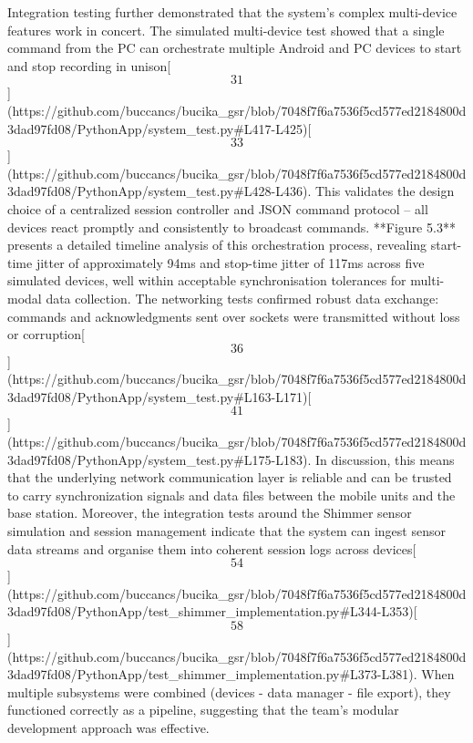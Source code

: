\documentclass[12pt,a4paper]{article}
\begin{document}
{Integration testing further demonstrated that the system's complex
multi-device features work in concert. The simulated multi-device test
showed that a single command from the PC can orchestrate multiple
Android and PC devices to start and stop recording in
unison[\[31\]](https://github.com/buccancs/bucika_gsr/blob/7048f7f6a7536f5cd577ed2184800d3dad97fd08/PythonApp/system_test.py#L417-L425)[\[33\]](https://github.com/buccancs/bucika_gsr/blob/7048f7f6a7536f5cd577ed2184800d3dad97fd08/PythonApp/system_test.py#L428-L436).
This validates the design choice of a centralized session controller and
JSON command protocol -- all devices react promptly and consistently to
broadcast commands. **Figure 5.3** presents a detailed timeline analysis of this orchestration process, revealing start-time jitter of approximately 94ms and stop-time jitter of 117ms across five simulated devices, well within acceptable synchronisation tolerances for multi-modal data collection. The networking tests confirmed robust data exchange:
commands and acknowledgments sent over sockets were transmitted without
loss or
corruption[\[36\]](https://github.com/buccancs/bucika_gsr/blob/7048f7f6a7536f5cd577ed2184800d3dad97fd08/PythonApp/system_test.py#L163-L171)[\[41\]](https://github.com/buccancs/bucika_gsr/blob/7048f7f6a7536f5cd577ed2184800d3dad97fd08/PythonApp/system_test.py#L175-L183).
In discussion, this means that the underlying network communication
layer is reliable and can be trusted to carry synchronization signals
and data files between the mobile units and the base station. Moreover,
the integration tests around the Shimmer sensor simulation and session
management indicate that the system can ingest sensor data streams and
organise them into coherent session logs across
devices[\[54\]](https://github.com/buccancs/bucika_gsr/blob/7048f7f6a7536f5cd577ed2184800d3dad97fd08/PythonApp/test_shimmer_implementation.py#L344-L353)[\[58\]](https://github.com/buccancs/bucika_gsr/blob/7048f7f6a7536f5cd577ed2184800d3dad97fd08/PythonApp/test_shimmer_implementation.py#L373-L381).
When multiple subsystems were combined (devices -\> data manager -\>
file export), they functioned correctly as a pipeline, suggesting that
the team's modular development approach was effective.

}
\end{document}
